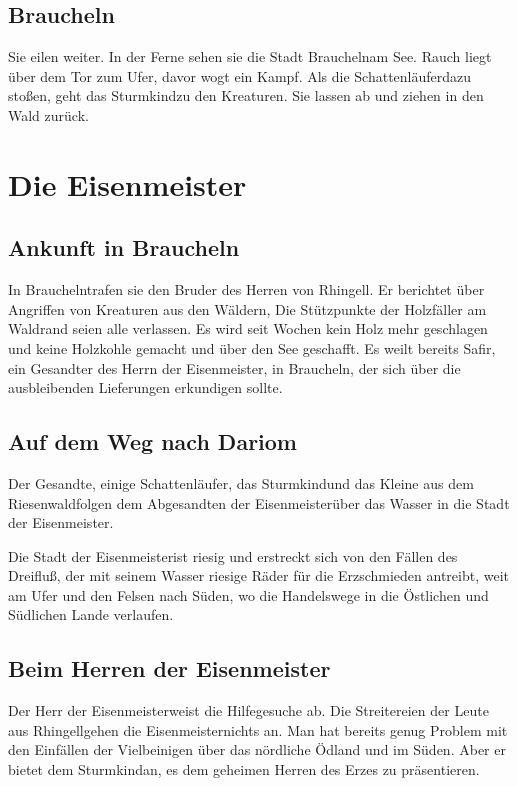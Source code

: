 \documentclass[12pt,a4paper,onecolumn,twoside,ngerman]{book}
\newcommand{\Sturmkind}{Sturmkind}
\newcommand{\Schattenjager}{Schattenläufer}
\newcommand{\Rhingell}{Rhingell}
\newcommand{\Dreifluss}{Dreifluß}
\newcommand{\Braucheln}{Braucheln}
\newcommand{\Riesenwald}{Riesenwald}
\newcommand{\Eisenmeister}{Eisenmeister}
\newcommand{\Dariom}{Dariom}
\newcommand{\Safir}{Safir}
\begin{document}
\section{\Braucheln}
Sie eilen weiter. In der Ferne sehen sie die Stadt \Braucheln am See. Rauch liegt über dem Tor zum Ufer, davor wogt ein Kampf. Als die \Schattenjager dazu stoßen, geht das \Sturmkind zu den Kreaturen. Sie lassen ab und ziehen in den Wald zurück.

\chapter{Die \Eisenmeister}
\section{Ankunft in \Braucheln}
In \Braucheln trafen sie den Bruder des Herren von \Rhingell. Er berichtet über Angriffen von Kreaturen aus den Wäldern, Die Stützpunkte der Holzfäller am Waldrand seien alle verlassen. Es wird seit Wochen kein Holz mehr geschlagen und keine Holzkohle gemacht und über den See geschafft. Es weilt bereits \Safir, ein Gesandter des Herrn der \Eisenmeister, in \Braucheln, der sich über die ausbleibenden Lieferungen erkundigen sollte.

\section{Auf dem Weg nach \Dariom}
Der Gesandte, einige \Schattenjager, das \Sturmkind und das Kleine aus dem \Riesenwald folgen dem Abgesandten der \Eisenmeister über das Wasser in die Stadt der \Eisenmeister.

Die Stadt der \Eisenmeister ist riesig und erstreckt sich von den Fällen des \Dreifluss, der mit seinem Wasser riesige Räder für die Erzschmieden antreibt, weit am Ufer und den Felsen nach Süden, wo die Handelswege in die Östlichen und Südlichen Lande verlaufen.

\section{Beim Herren der \Eisenmeister}
Der Herr der \Eisenmeister weist die Hilfegesuche ab. Die Streitereien der Leute aus \Rhingell gehen die \Eisenmeister nichts an. Man hat bereits genug Problem mit den Einfällen der Vielbeinigen über das nördliche Ödland und im Süden. Aber er bietet dem \Sturmkind an, es dem geheimen Herren des Erzes zu präsentieren.
\end{document}
